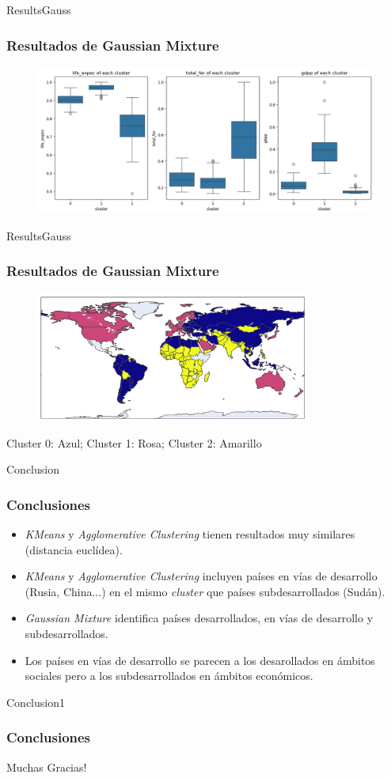 \documentclass{beamer}
\begin{document}
\begin{frame}{ResultsGauss}
  \frametitle{Resultados de Gaussian Mixture}
  \begin{figure}
    \includegraphics[width=\textwidth]{../images/gaussian/features-dist-3.jpg}
  \end{figure}
\end{frame}

\begin{frame}{ResultsGauss}
  \frametitle{Resultados de Gaussian Mixture}
  \centering
  \begin{figure}
    \includegraphics[width=0.8\textwidth]{../images/gaussian/map-cropped.png}
  \end{figure}
  Cluster 0: Azul; Cluster 1: Rosa; Cluster 2: Amarillo
\end{frame}

\begin{frame}{Conclusion}
  \frametitle{Conclusiones}
  \begin{itemize}
    \item \textit{KMeans} y \textit{Agglomerative Clustering} tienen resultados muy similares (distancia euclídea).
    \pause
    \item \textit{KMeans} y \textit{Agglomerative Clustering} incluyen países en vías de desarrollo (Rusia, China...) en el mismo \textit{cluster} que países subdesarrollados (Sudán).
    \pause
    \item \textit{Gaussian Mixture} identifica países desarrollados, en vías de desarrollo y subdesarrollados.
    \pause
    \item Los países en vías de desarrollo se parecen a los desarollados en ámbitos sociales pero a los subdesarrollados en ámbitos económicos.
  \end{itemize}
\end{frame}

\begin{frame}{Conclusion1}
  \frametitle{Conclusiones}
  \centering
  Muchas Gracias!
\end{frame}
\end{document}
